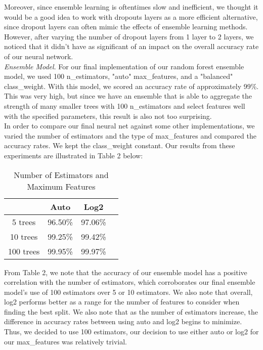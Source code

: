 \documentclass[11pt]{article}
\begin{document}
Moreover, since ensemble learning is oftentimes slow and inefficient, we thought
it would be a good idea to work with dropouts layers as a more efficient alternative, since dropout
layers can often mimic the effects of ensemble learning methods. However,
after varying the number of dropout layers from 1 layer to 2 layers, we noticed
that it didn't have as significant of an impact on the overall accuracy rate of
our neural network. \\

\textit{Ensemble Model}. For our final implementation of our random forest
ensemble model, we used 100 n\_estimators, "auto" max\_features, and a "balanced"
class\_weight.
With this model, we scored an accuracy rate of approximately 99\%.
This was very high, but since we have an ensemble that is able to aggregate
the strength of many smaller trees with 100 n\_estimators and select
features well with the specified parameters, this result is also not too surprising. \\

In order to compare our final neural net against some other implementations, we
varied the number of estimators and the type of max\_features and compared the accuracy rates.
We kept the class\_weight constant. Our results
from these experiments are illustrated in Table 2 below:

\begin{table}[h!]
\centering
\begin{tabular}{ |c|c|c|c| }
 \hline
    & Auto & Log2 \\
 \hline
 5 trees & 96.50\% &  97.06\% \\
 \hline
 10 trees & 99.25\% & 99.42\% \\
 \hline
 100 trees & 99.95\% & 99.97\% \\
 \hline
\end{tabular}

\caption{Number of Estimators and Maximum Features}
\end{table}

From Table 2, we note that the accuracy of our ensemble model has a positive
correlation with the number of estimators, which corroborates our final
ensemble model's use of 100 estimators over 5 or 10 estimators. We also note that
overall, log2 performs better as a range for the number of features to consider
when finding the best split. We also note that as the number of estimators
increase, the difference in accuracy rates between using auto and log2 begins to
minimize. Thus, we decided to use 100 estimators, our decision to use either
auto or log2 for our max\_features was relatively trivial. \\
\end{document}
